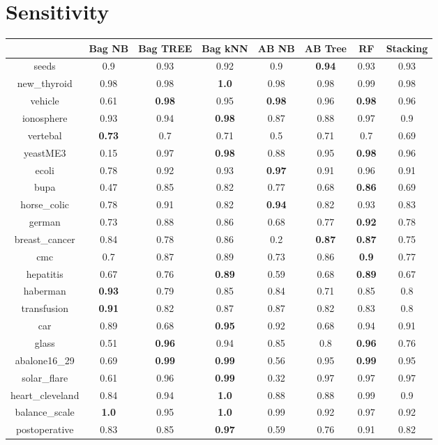 \documentclass{article}%
\begin{document}
%
\section*{Sensitivity}%
\begin{tabular}{c|ccccccc}%
&Bag NB&Bag TREE&Bag kNN&AB NB&AB Tree&RF&Stacking\\%
\hline%
seeds&0.9&0.93&0.92&0.9&\textbf{0.94}&0.93&0.93\\%
new\_thyroid&0.98&0.98&\textbf{1.0}&0.98&0.98&0.99&0.98\\%
vehicle&0.61&\textbf{0.98}&0.95&\textbf{0.98}&0.96&\textbf{0.98}&0.96\\%
ionosphere&0.93&0.94&\textbf{0.98}&0.87&0.88&0.97&0.9\\%
vertebal&\textbf{0.73}&0.7&0.71&0.5&0.71&0.7&0.69\\%
yeastME3&0.15&0.97&\textbf{0.98}&0.88&0.95&\textbf{0.98}&0.96\\%
ecoli&0.78&0.92&0.93&\textbf{0.97}&0.91&0.96&0.91\\%
bupa&0.47&0.85&0.82&0.77&0.68&\textbf{0.86}&0.69\\%
horse\_colic&0.78&0.91&0.82&\textbf{0.94}&0.82&0.93&0.83\\%
german&0.73&0.88&0.86&0.68&0.77&\textbf{0.92}&0.78\\%
breast\_cancer&0.84&0.78&0.86&0.2&\textbf{0.87}&\textbf{0.87}&0.75\\%
cmc&0.7&0.87&0.89&0.73&0.86&\textbf{0.9}&0.77\\%
hepatitis&0.67&0.76&\textbf{0.89}&0.59&0.68&\textbf{0.89}&0.67\\%
haberman&\textbf{0.93}&0.79&0.85&0.84&0.71&0.85&0.8\\%
transfusion&\textbf{0.91}&0.82&0.87&0.87&0.82&0.83&0.8\\%
car&0.89&0.68&\textbf{0.95}&0.92&0.68&0.94&0.91\\%
glass&0.51&\textbf{0.96}&0.94&0.85&0.8&\textbf{0.96}&0.76\\%
abalone16\_29&0.69&\textbf{0.99}&\textbf{0.99}&0.56&0.95&\textbf{0.99}&0.95\\%
solar\_flare&0.61&0.96&\textbf{0.99}&0.32&0.97&0.97&0.97\\%
heart\_cleveland&0.84&0.94&\textbf{1.0}&0.88&0.88&0.99&0.9\\%
balance\_scale&\textbf{1.0}&0.95&\textbf{1.0}&0.99&0.92&0.97&0.92\\%
postoperative&0.83&0.85&\textbf{0.97}&0.59&0.76&0.91&0.82\\%
\end{tabular}
\end{document}
